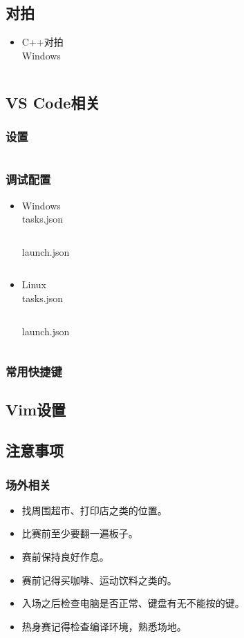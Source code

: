 \documentclass[a4paper, twoside]{article}
\begin{document}
\subsection{对拍}
\begin{itemize}
    \item C++对拍\\
    Windows
    \inputminted{cpp}{../src/附录/C++对拍（Windows）.cpp}
\end{itemize}

\subsection{VS Code相关}
    \subsubsection{设置}
    \inputminted{json}{../src/附录/VSCode/settings.json}

    \subsubsection{调试配置}
    \begin{itemize}
        \item Windows\\
        tasks.json
        \inputminted{json}{../src/附录/VSCode/Windows-tasks.json}
        launch.json
        \inputminted{json}{../src/附录/VSCode/Windows-launch.json}
        \item Linux\\
        tasks.json
        \inputminted{json}{../src/附录/VSCode/Linux-tasks.json}
        launch.json
        \inputminted{json}{../src/附录/VSCode/Linux-launch.json}
    \end{itemize}

    \subsubsection{常用快捷键}

\subsection{Vim设置}

\subsection{注意事项}

    \subsubsection{场外相关}
    \begin{itemize}
        \item 找周围超市、打印店之类的位置。
        \item 比赛前至少要翻一遍板子。
        \item 赛前保持良好作息。
        \item 赛前记得买咖啡、运动饮料之类的。
        \item 入场之后检查电脑是否正常、键盘有无不能按的键。
        \item 热身赛记得检查编译环境，熟悉场地。
    \end{itemize}
\end{document}
